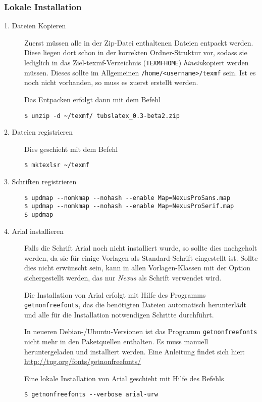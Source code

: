 \subsubsection{Lokale Installation}

\begin{description}
  \item[1. Dateien Kopieren] Zuerst müssen alle in der Zip-Datei enthaltenen
    Dateien entpackt werden.
    Diese liegen dort schon in der korrekten Ordner-Struktur vor, sodass
    sie lediglich in das Ziel-texmf-Verzeichnis (\texttt{TEXMFHOME}) \emph{hinein}kopiert werden
    müssen. Dieses sollte im Allgemeinen \lstinline{/home/<username>/texmf}
    sein. Ist es noch nicht vorhanden, so muss es zuerst erstellt werden.

    Das Entpacken erfolgt dann mit dem Befehl
    \begin{lstlisting}[style=cmd]
$ unzip -d ~/texmf/ tubslatex_0.3-beta2.zip
    \end{lstlisting}

  \item[2. Dateien registrieren]
    Dies geschieht mit dem Befehl
    \begin{lstlisting}[style=cmd]
$ mktexlsr ~/texmf
    \end{lstlisting}

  \item[3. Schriften registrieren]\hfill

    \begin{lstlisting}[style=cmd]
$ updmap --nomkmap --nohash --enable Map=NexusProSans.map
$ updmap --nomkmap --nohash --enable Map=NexusProSerif.map
$ updmap
    \end{lstlisting}
    
  \item[4. Arial installieren]
    Falls die Schrift Arial noch nicht installiert wurde, so sollte dies
    nachgeholt werden, da sie für einige Vorlagen als Standard-Schrift
    eingestellt ist. Sollte dies nicht erwünscht sein, kann in allen
    Vorlagen-Klassen mit der Option  sichergestellt werden,
    das nur \emph{Nexus} als Schrift verwendet wird.
    
    Die Installation von Arial erfolgt mit Hilfe des Programms
    \lstinline{getnonfreefonts}, das die benötigten Dateien automatisch
    herunterlädt und alle für die Installation notwendigen Schritte durchführt.
    \begin{hint}
      In neueren Debian-/Ubuntu-Versionen ist das Programm \texttt{getnonfreefonts}
      nicht mehr in den Paketquellen enthalten.
      Es muss manuell heruntergeladen und installiert werden.
      Eine Anleitung findet sich hier:
      \url{http://tug.org/fonts/getnonfreefonts/}
    \end{hint}
    
    Eine lokale Installation von Arial geschieht mit Hilfe des Befehls
    \begin{lstlisting}[style=cmd]
$ getnonfreefonts --verbose arial-urw
    \end{lstlisting}
    
\end{description}



